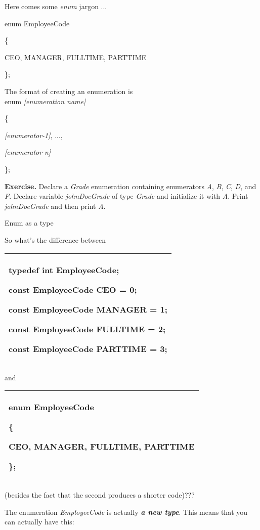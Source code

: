 \documentclass[
]{article}
\begin{document}
Here comes some \emph{enum} jargon ...

enum EmployeeCode

\{

CEO, MANAGER, FULLTIME, PARTTIME

\};

The format of creating an enumeration is\\

enum \emph{{[}enumeration name{]}}

\{

\emph{{[}enumerator-1{]}}, ...,

\emph{{[}enumerator-n{]}}

\};

\textbf{Exercise.} Declare a \emph{Grade} enumeration containing
enumerators \emph{A}, \emph{B}, \emph{C}, \emph{D}, and \emph{F}.
Declare variable \emph{johnDoeGrade} of type \emph{Grade} and initialize
it with \emph{A}. Print \emph{johnDoeGrade} and then print \emph{A}.

Enum as a type

So what's the difference between

\begin{longtable}[]{@{}l@{}}
\toprule
\endhead
\begin{minipage}[t]{0.97\columnwidth}\raggedright
typedef int EmployeeCode;

const EmployeeCode CEO = 0;

const EmployeeCode MANAGER = 1;

const EmployeeCode FULLTIME = 2;

const EmployeeCode PARTTIME = 3;\strut
\end{minipage}\tabularnewline
\bottomrule
\end{longtable}

and

\begin{longtable}[]{@{}l@{}}
\toprule
\endhead
\begin{minipage}[t]{0.97\columnwidth}\raggedright
enum EmployeeCode

\{

CEO, MANAGER, FULLTIME, PARTTIME

\};\strut
\end{minipage}\tabularnewline
\bottomrule
\end{longtable}

(besides the fact that the second produces a shorter code)???

The enumeration \emph{EmployeeCode} is actually \emph{\textbf{a new
type}}. This means that you can actually have this:
\end{document}
